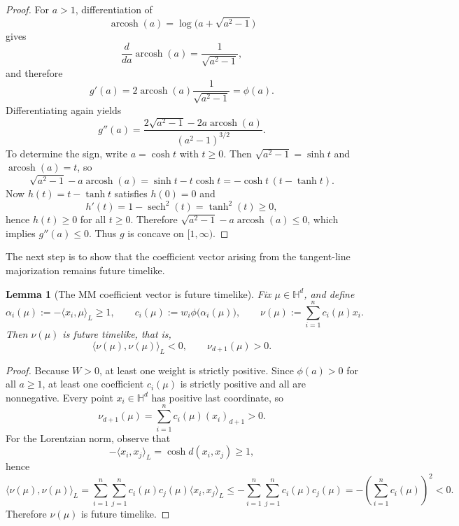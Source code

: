 \documentclass[11pt]{article}
\newtheorem{lemma}[theorem]{Lemma}
\begin{document}
\begin{proof}
For \(a>1\), differentiation of
\[
\operatorname{arcosh}(a)=\log\!\bigl(a+\sqrt{a^2-1}\bigr)
\]
gives
\[
\frac{d}{da}\operatorname{arcosh}(a)=\frac{1}{\sqrt{a^2-1}},
\]
and therefore
\[
g'(a)=2\operatorname{arcosh}(a)\frac{1}{\sqrt{a^2-1}}=\phi(a).
\]
Differentiating again yields
\[
g''(a)
=
\frac{2\sqrt{a^2-1}-2a\operatorname{arcosh}(a)}{(a^2-1)^{3/2}}.
\]
To determine the sign, write \(a=\cosh t\) with \(t\ge 0\). Then \(\sqrt{a^2-1}=\sinh t\) and \(\operatorname{arcosh}(a)=t\), so
\[
\sqrt{a^2-1}-a\operatorname{arcosh}(a)
=
\sinh t-t\cosh t
=
-\cosh t\,(t-\tanh t).
\]
Now \(h(t)=t-\tanh t\) satisfies \(h(0)=0\) and
\[
h'(t)=1-\operatorname{sech}^2(t)=\tanh^2(t)\ge 0,
\]
hence \(h(t)\ge 0\) for all \(t\ge 0\). Therefore \(\sqrt{a^2-1}-a\operatorname{arcosh}(a)\le 0\), which implies \(g''(a)\le 0\). Thus \(g\) is concave on \([1,\infty)\).
\end{proof}

The next step is to show that the coefficient vector arising from the tangent-line majorization remains future timelike.

\begin{lemma}[The MM coefficient vector is future timelike]\label{lem:mm-timelike}
Fix \(\mu\in\mathbb{H}^d\), and define
\begin{equation}\label{eq:mm-ci-def}
\alpha_i(\mu):=-\langle x_i,\mu\rangle_L\ge 1,
\qquad
c_i(\mu):=w_i\phi\bigl(\alpha_i(\mu)\bigr),
\qquad
\nu(\mu):=\sum_{i=1}^n c_i(\mu)x_i.
\end{equation}
Then \(\nu(\mu)\) is future timelike, that is,
\[
\langle \nu(\mu),\nu(\mu)\rangle_L<0,
\qquad
\nu_{d+1}(\mu)>0.
\]
\end{lemma}

\begin{proof}
Because \(W>0\), at least one weight is strictly positive. Since \(\phi(a)>0\) for all \(a\ge 1\), at least one coefficient \(c_i(\mu)\) is strictly positive and all are nonnegative. Every point \(x_i\in\mathbb{H}^d\) has positive last coordinate, so
\[
\nu_{d+1}(\mu)=\sum_{i=1}^n c_i(\mu)(x_i)_{d+1}>0.
\]
For the Lorentzian norm, observe that
\[
-\langle x_i,x_j\rangle_L=\cosh d(x_i,x_j)\ge 1,
\]
hence
\[
\langle \nu(\mu),\nu(\mu)\rangle_L
=
\sum_{i=1}^n\sum_{j=1}^n c_i(\mu)c_j(\mu)\langle x_i,x_j\rangle_L
\le
-\sum_{i=1}^n\sum_{j=1}^n c_i(\mu)c_j(\mu)
=
-\left(\sum_{i=1}^n c_i(\mu)\right)^2<0.
\]
Therefore \(\nu(\mu)\) is future timelike.
\end{proof}
\end{document}
